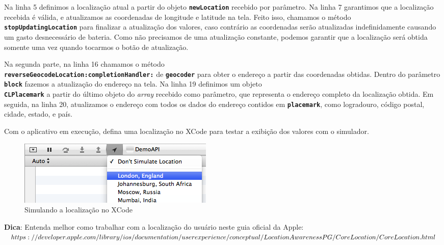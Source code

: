 \documentclass[a4paper,12pt,brazil,doubleside]{book}
\begin{document}
\begin{singlespace}
Na linha 5 definimos a localização atual a partir do objeto \texttt{\textbf{newLocation}} recebido por parâmetro. Na linha 7 garantimos que a localização recebida é válida, e atualizamos as coordenadas de longitude e latitude na tela. Feito isso, chamamos o método\\ \texttt{\textbf{stopUpdatingLocation}} para finalizar a atualização dos valores, caso contrário as coordenadas serão atualizadas indefinidamente causando um gasto desnecessário de bateria. Como não precisamos de uma atualização constante, podemos garantir que a localização será obtida somente uma vez quando tocarmos o botão de atualização.

Na segunda parte, na linha 16 chamamos o método\\ \texttt{\textbf{reverseGeocodeLocation:completionHandler:}} de \texttt{\textbf{geocoder}} para obter o endereço a partir das coordenadas obtidas. Dentro do parâmetro \texttt{\textbf{block}} fazemos a atualização do endereço na tela. Na linha 19 definimos um objeto\\ \texttt{\textbf{CLPlacemark}} a partir do último objeto do \emph{array} recebido como parâmetro, que representa o endereço completo da localização obtida. Em seguida, na linha 20, atualizamos o endereço com todos os dados do endereço contidos em \texttt{\textbf{placemark}}, como logradouro, código postal, cidade, estado, e país.

Com o aplicativo em execução, defina uma localização no XCode para testar a exibição dos valores com o simulador.

\bigskip
\bigskip

\begin{figure}[H]
  \centering
  \includegraphics[width=.75\textwidth]{figuras/location.png}
  \caption{Simulando a localização no XCode}
  \label{fig:a}
\end{figure}

\bigskip

\begin{framed}

\textbf{Dica}: Entenda melhor como trabalhar com a localização do usuário neste guia oficial da Apple:\\
\(https://developer.apple.com/library/ios/documentation/userexperience/conceptual/\\LocationAwarenessPG/CoreLocation/CoreLocation.html\)
\end{framed}


\end{singlespace}
\end{document}
